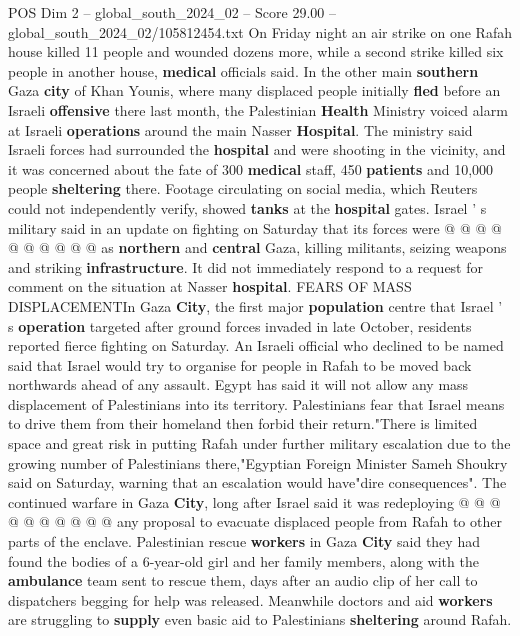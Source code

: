 \begin{textsample}{POS Dim 2 – global\_south\_2024\_02 – Score 29.00 – global\_south\_2024\_02/105812454.txt}
On Friday night an air strike on one Rafah house killed 11 people and wounded dozens more, while a second strike killed six people in another house, \textbf{medical} officials said.
In the other main \textbf{southern} Gaza \textbf{city} of Khan Younis, where many displaced people initially \textbf{fled} before an Israeli \textbf{offensive} there last month, the Palestinian \textbf{Health} Ministry voiced alarm at Israeli \textbf{operations} around the main Nasser \textbf{Hospital}.
The ministry said Israeli forces had surrounded the \textbf{hospital} and were shooting in the vicinity, and it was concerned about the fate of 300 \textbf{medical} staff, 450 \textbf{patients} and 10,000 people \textbf{sheltering} there.
Footage circulating on social media, which Reuters could not independently verify, showed \textbf{tanks} at the \textbf{hospital} gates.
Israel ' s military said in an update on fighting on Saturday that its forces were @ @ @ @ @ @ @ @ @ @ as \textbf{northern} and \textbf{central} Gaza, killing militants, seizing weapons and striking \textbf{infrastructure}.
It did not immediately respond to a request for comment on the situation at Nasser \textbf{hospital}.
FEARS OF MASS DISPLACEMENTIn Gaza \textbf{City}, the first major \textbf{population} centre that Israel ' s \textbf{operation} targeted after ground forces invaded in late October, residents reported fierce fighting on Saturday.
An Israeli official who declined to be named said that Israel would try to organise for people in Rafah to be moved back northwards ahead of any assault.
Egypt has said it will not allow any mass displacement of Palestinians into its territory.
Palestinians fear that Israel means to drive them from their homeland then forbid their return."There is limited space and great risk in putting Rafah under further military escalation due to the growing number of Palestinians there,"Egyptian Foreign Minister Sameh Shoukry said on Saturday, warning that an escalation would have"dire consequences".
The continued warfare in Gaza \textbf{City}, long after Israel said it was redeploying @ @ @ @ @ @ @ @ @ @ any proposal to evacuate displaced people from Rafah to other parts of the enclave.
Palestinian rescue \textbf{workers} in Gaza \textbf{City} said they had found the bodies of a 6-year-old girl and her family members, along with the \textbf{ambulance} team sent to rescue them, days after an audio clip of her call to dispatchers begging for help was released.
Meanwhile doctors and aid \textbf{workers} are struggling to \textbf{supply} even basic aid to Palestinians \textbf{sheltering} around Rafah.

\end{textsample}
